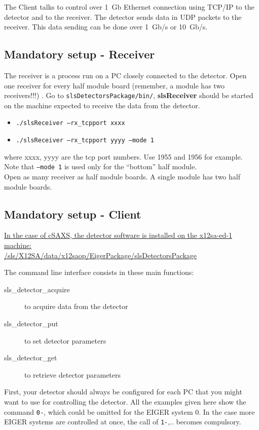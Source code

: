 \documentclass{article}
\begin{document}
The Client talks to control over 1~Gb Ethernet connection using TCP/IP to the detector and to the receiver. The detector sends data in UDP packets to the receiver. This data sending can be done over 1~Gb/s or 10~Gb/s. 
 

\subsection{Mandatory setup - Receiver}

The receiver is a process run on a PC closely connected to the detector. Open one receiver for every half module board (remember, a module has two receivers!!!) . Go to {\tt{slsDetectorsPackage/bin/}}, \textbf{slsReceiver} should be started on the machine expected to receive the data from the detector.

\begin{itemize}
\item {\tt{./slsReceiver --rx\_tcpport xxxx}} 
\item {\tt{./slsReceiver --rx\_tcpport yyyy --mode 1}}
\end{itemize}

where xxxx, yyyy are the tcp port numbers. Use 1955 and 1956 for example. Note that {\tt{--mode 1}} is used only for the ``bottom'' half module. \\ Open as many receiver as half module boards. A single module has two half module boards.

\subsection{Mandatory setup - Client}

\underline{In the case of cSAXS, the detector software is installed on the x12sa-ed-1 machine:}\\
\underline{/sls/X12SA/data/x12saop/EigerPackage/slsDetectorsPackage}

The command line interface consists in these main functions:
\begin{description}
\item[sls\_detector\_acquire] to acquire data from the detector
\item[sls\_detector\_put] to set detector parameters
\item[sls\_detector\_get] to retrieve detector parameters
\end{description}


First, your detector should always be configured for each PC that you might want to use for controlling the detector. All the examples given here show the command {\tt{0-}}, which could be omitted for the EIGER system $0$. In the case more EIGER systems are controlled at once, the call of {\tt{1-}},.. becomes compulsory.
\end{document}
